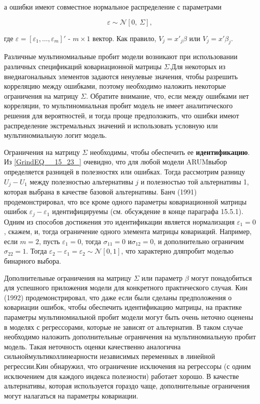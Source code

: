 а ошибки имеют совместное нормальное распределение с параметрами

\begin{equation} \label{GrindEQ__15_46_} \varepsilon \sim {\mathcal N}\left[0,\ \Sigma \right], \end{equation} 

где $\varepsilon =[{\varepsilon }_1,\dots ,{\varepsilon }_m]'$ - $m\times 1$ вектор. Как правило, $V_j=x'_j\beta $ или $V_j=x'{\beta }_j$.

Различные мультиномиальные пробит модели возникают при использовании различных спецификаций ковариационной матрицы $\Sigma $.Для некоторых из внедиагональных элементов задаются ненулевые значения, чтобы разрешить корреляцию между ошибками, поэтому необходимо наложить некоторые ограничения на матрицу $\Sigma $. Обратите внимание, что, если между ошибками нет корреляции, то мультиномиальная пробит модель не имеет аналитического решения для вероятностей, и тогда проще предположить, что ошибки имеют  распределение экстремальных значений и использовать условную или мультиномиальную логит модель.

Ограничения на матрицу $\Sigma $ необходимы, чтобы обеспечить ее \textbf{идентификацию}. Из \eqref{GrindEQ__15_23_} очевидно, что для любой модели ARUMвыбор определяется разницей в полезностях или ошибках. Тогда рассмотрим разницу $U_j-U_1$ между полезностью альтернативы $j$ и полезностью той альтернативы 1, которая выбрана в качестве базовой альтернативы. Банч (1991)  продемонстрировал, что все кроме одного параметры ковариационной матрицы ошибок ${\varepsilon }_j-{\varepsilon }_1$ идентифицируемы (см. обсуждение в конце параграфа 15.5.1). Одним из способов достижения это идентификации является нормализация ${\varepsilon }_1=0$, скажем, и, тогда ограничение одного элемента матрицы ковариаций. Например, если $m=2$, пусть ${\varepsilon }_1=0$, тогда ${\sigma }_{11}=0$ и${\sigma }_{12}=0$, и дополнительно ограничим ${\sigma }_{22}=1$. Тогда ${\varepsilon }_2-{\varepsilon }_1={\varepsilon }_2\sim {\mathcal N}[0,1]$, что характерно дляпробит моделью бинарного выбора.

Дополнительные ограничения на матрицу $\Sigma $ или параметр $\beta $ могут понадобиться для успешного приложения модели для конкретного практического случая. Кин (1992) продемонстрировал, что даже если были сделаны предположения о ковариации ошибок, чтобы обеспечить идентификацию матрицы, на практике параметры мультиномиальной пробит модели могут быть очень неточно оценены в моделях с регрессорами, которые не зависят от альтернатив. В таком случае необходимо наложить дополнительные ограничения на мультиномиальную пробит модель. Такая неточность оценки качественно аналогична сильноймультиколлинеарности независимых переменных в линейной регрессии.Кин обнаружил, что ограничение исключения на регрессоры (с одним исключением для каждого индекса полезности) работает хорошо.  В качестве альтернативы, которая используется гораздо чаще, дополнительные ограничения могут налагаться на параметры ковариации.

